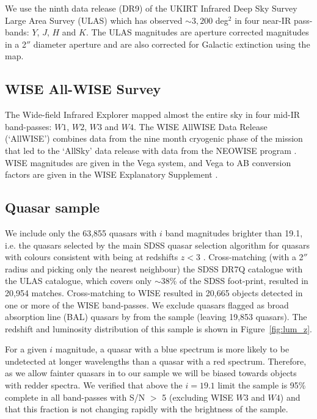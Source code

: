 We use the ninth data release (DR9) of the UKIRT Infrared Deep Sky Survey \citep[UKIDSS;][]{lawrence07} Large Area Survey (ULAS) which has observed $\sim 3,200$ deg$^2$ in four near-IR pass-bands: $Y$, $J$, $H$ and $K$. 
The ULAS magnitudes are aperture corrected magnitudes in a 2$''$ diameter aperture and are also corrected for Galactic extinction using the \citet{schlegel98} map. 

\subsection{WISE All-WISE Survey}

The Wide-field Infrared Explorer \citep[WISE;][]{wright10} mapped almost the entire sky in four mid-IR band-passes: $W1$, $W2$, $W3$ and $W4$. 
The WISE AllWISE Data Release (`AllWISE') combines data from the nine month cryogenic phase of the mission that led to the `AllSky' data release with data from the NEOWISE program \citep{mainzer11}. 
WISE magnitudes are given in the Vega system, and Vega to AB conversion factors are given in the WISE Explanatory Supplement \citep{cutri13}. 

\subsection{Quasar sample}

We include only the 63,855 quasars with $i$ band magnitudes brighter than 19.1, i.e. the quasars selected by the main SDSS quasar selection algorithm for quasars with colours consistent with being at redshifts $z < 3$ \citep{richards02}. 
Cross-matching (with a 2$''$ radius and picking only the nearest neighbour) the SDSS DR7Q catalogue with the ULAS catalogue, which covers only $\sim 38$\% of the SDSS foot-print, resulted in 20,954 matches. 
Cross-matching to WISE resulted in 20,665 objects detected in one or more of the WISE band-passes. 
We exclude quasars flagged as broad absorption line (BAL) quasars by \citet{allen11} from the sample (leaving 19,853 quasars).
The redshift and luminosity distribution of this sample is shown in Figure~\ref{fig:lum_z}. 

For a given $i$ magnitude, a quasar with a blue spectrum is more likely to be undetected at longer wavelengths than a quasar with a red spectrum. 
Therefore, as we allow fainter quasars in to our sample we will be biased towards objects with redder spectra.
We verified that above the $i=19.1$ limit the sample is 95\% complete in all band-passes with S/N $>$ 5 (excluding WISE $W3$ and $W4$) and that this fraction is not changing rapidly with the brightness of the sample. 

